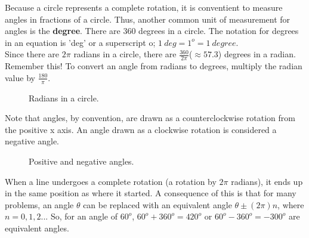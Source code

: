 Because a circle represents a complete rotation, it is conventient to measure angles in fractions of a circle.  Thus, another common unit of measurement for angles is the {\bf degree}.  There are $360$ degrees in a circle.  The notation for degrees in an equation is 'deg' or a superscript o;  $1\  deg = 1^o = 1 \ degree$.\\

Since there are $2\pi$ radians in a circle, there are $\frac{360}{2\pi}$($\approx 57.3$) degrees in a radian.  Remember this!  To convert an angle from radians to degrees, multiply the radian value by $\frac{180}{\pi}$.\\

\begin{figure}[htb]
\center
\caption{Radians in a circle.}
\label{fig:radians}
\end{figure}

Note that angles, by convention, are drawn as a counterclockwise rotation from the positive x axis.  An angle drawn as a clockwise rotation is considered a negative angle.\\

\begin{figure}[htb]
\center
\caption{Positive and negative angles.}
\label{fig:positive_and_negative}
\end{figure}

When a line undergoes a complete rotation (a rotation by $2\pi$ radians), it ends up in the same position as where it started.  A consequence of this is that for many problems, an angle $\theta$ can be replaced with an equivalent angle $\theta \pm  (2\pi)n$, where $n= 0, 1, 2...$  So, for an angle of $60^o$, $60^o + 360^o = 420^o$ or $60^o - 360^o = -300^o$ are equivalent angles.\\

